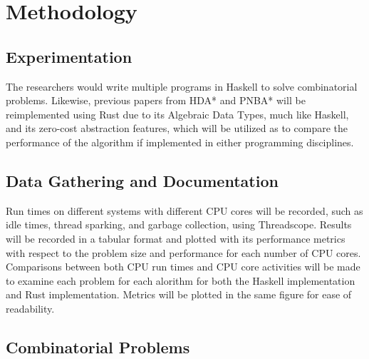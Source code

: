 \chapter{Methodology}

\section{Experimentation}
The researchers would write multiple programs in Haskell to solve combinatorial problems.
Likewise, previous papers from HDA* and PNBA* will be reimplemented using Rust due to its 
Algebraic Data Types, much like Haskell, and its zero-cost abstraction features, which will
be utilized as to compare the performance of the algorithm if implemented in either 
programming disciplines.\cite{Kishimoto2009,Rios2011}

\section{Data Gathering and Documentation}
Run times on different systems with different CPU cores will be recorded, such as 
idle times, thread sparking, and garbage collection, using Threadscope.\cite{ThreadScope} Results will be recorded 
in a tabular format and plotted with its performance metrics with respect to the problem size 
and performance for each number of CPU cores.
Comparisons between both CPU run times and CPU core activities will be made to examine each
problem for each alorithm for both the Haskell implementation and Rust implementation. 
Metrics will be plotted in the same figure for ease of readability.

\section{Combinatorial Problems}


